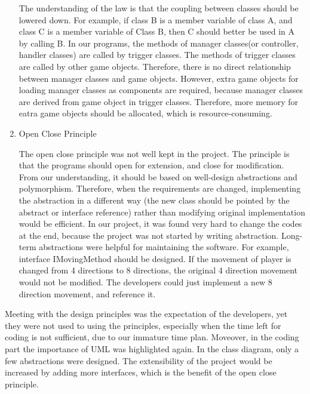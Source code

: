 \documentclass[12pt, a4paper]{report}
\begin{document}
\begin{enumerate}
				The understanding of the law  is that the coupling between classes should be lowered down. For example, if class B is a member variable of class A, and class C is a member variable of Class B, then C should better be used in A by calling B. In our programs, the methods of manager classes(or controller, handler classes) are called by trigger classes. The methods of trigger classes are called by other game objects. Therefore, there is no direct relationship between manager classes and game objects. However, extra game objects for loading manager classes as components are required, because manager classes are derived from game object in trigger classes. Therefore, more memory for eatra game objects should be allocated, which is resource-consuming. \\
			\item Open Close Principle


				The open close principle was not well kept in the project. The principle is that the programs should open for extension, and close for modification. From our understanding, it should be based on well-design abstractions and polymorphism. Therefore, when the requirements are changed, implementing the abstraction in a different way (the new class should be pointed by the abstract or interface reference) rather than modifying original implementation would be efficient. In our project, it was found very hard to change the codes at the end, because the project was not started by writing abstraction.  Long-term abstractions were helpful for maintaining the software. For example, interface IMovingMethod should be designed. If the movement of player is changed from 4 directions to 8 directions, the original 4 direction movement would not be modified. The developers could just implement a new 8 direction movement, and reference it.\\


			\end{enumerate}

			Meeting with the design principles was the expectation of the developers, yet they were not used to using the principles, especially when the time left for coding is not sufficient, due to our immature time plan. Moveover, in the coding part the importance of UML was highlighted again. In the class diagram, only a few abstractions were designed. The extensibility of the project would be increased by adding more interfaces, which is the benefit of the open close principle. \\
\end{document}
